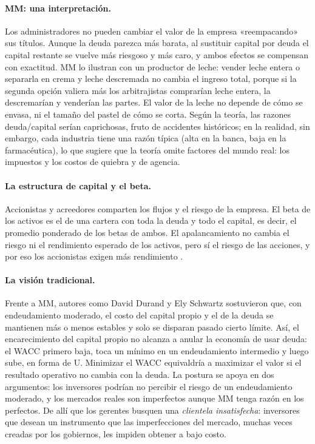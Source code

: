 \paragraph{MM: una interpretación.} Los administradores no pueden cambiar el valor de la empresa «reempacando» sus títulos. Aunque la deuda parezca más barata, al sustituir capital por deuda el capital restante se vuelve más riesgoso y más caro, y ambos efectos se compensan con exactitud. MM lo ilustran con un productor de leche: vender leche entera o separarla en crema y leche descremada no cambia el ingreso total, porque si la segunda opción valiera más los arbitrajistas comprarían leche entera, la descremarían y venderían las partes. El valor de la leche no depende de cómo se envasa, ni el tamaño del pastel de cómo se corta. Según la teoría, las razones deuda/capital serían caprichosas, fruto de accidentes históricos; en la realidad, sin embargo, cada industria tiene una razón típica (alta en la banca, baja en la farmacéutica), lo que sugiere que la teoría omite factores del mundo real: los impuestos y los costos de quiebra y de agencia.

\paragraph{La estructura de capital y el beta.} Accionistas y acreedores comparten los flujos y el riesgo de la empresa. El beta de los activos es el de una cartera con toda la deuda y todo el capital, es decir, el promedio ponderado de los betas de ambos. El apalancamiento no cambia el riesgo ni el rendimiento esperado de los activos, pero sí el riesgo de las acciones, y por eso los accionistas exigen más rendimiento .

\paragraph{La visión tradicional.} Frente a MM, autores como David Durand y Ely Schwartz sostuvieron que, con endeudamiento moderado, el costo del capital propio y el de la deuda se mantienen más o menos estables y solo se disparan pasado cierto límite. Así, el encarecimiento del capital propio no alcanza a anular la economía de usar deuda: el WACC primero baja, toca un mínimo en un endeudamiento intermedio y luego sube, en forma de U. Minimizar el WACC equivaldría a maximizar el valor si el resultado operativo no cambia con la deuda. La postura se apoya en dos argumentos: los inversores podrían no percibir el riesgo de un endeudamiento moderado, y los mercados reales son imperfectos aunque MM tenga razón en los perfectos. De allí que los gerentes busquen una \emph{clientela insatisfecha}: inversores que desean un instrumento que las imperfecciones del mercado, muchas veces creadas por los gobiernos, les impiden obtener a bajo costo.

